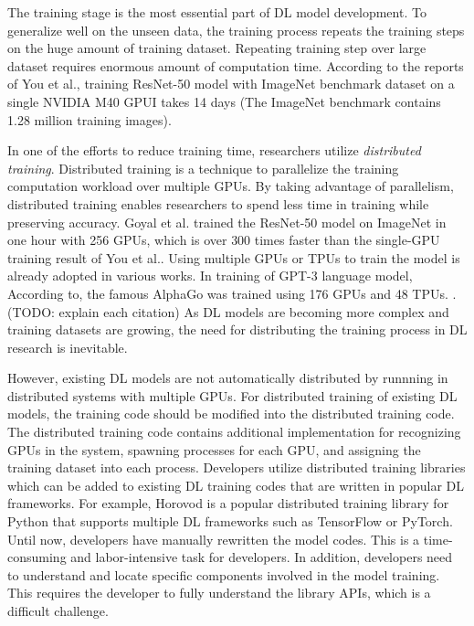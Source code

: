 The training stage is the most essential part of DL model development.
To generalize well on the unseen data,
the training process repeats the training steps on the huge amount of
training dataset.
Repeating training step over large dataset requires enormous
amount of computation time.
According to the reports of You et al.\cite{imagenetraining2017},
training ResNet-50 model with ImageNet benchmark dataset
on a single NVIDIA M40 GPUI takes 14 days
(The ImageNet benchmark\cite{imagenet2014} 
contains 1.28 million training images). 

In one of the efforts to reduce training time, 
researchers utilize \textit{distributed training}.
Distributed training is a technique to parallelize the training computation
workload over multiple GPUs.
By taking advantage of parallelism, distributed training enables researchers
to spend less time in training while preserving accuracy.
Goyal et al.\cite{facebook2018} trained the ResNet-50 model on ImageNet
in one hour with 256 GPUs, which is over 300 times faster than the
single-GPU training result of You et al.\cite{imagenettraining2017}.
Using multiple GPUs or TPUs to train the model is already adopted
in various works.
In training of GPT-3 language model\cite{gpt32020}, 
According to\cite{Silver2017alphagozero}, the famous AlphaGo 
was trained using 176 GPUs and 48 TPUs.
\cite{zhang2019distrspeech} \cite{tian2020distrwebattack}.
(TODO: explain each citation)
As DL models are becoming more complex and training datasets are growing,
the need for distributing the training process in DL research is inevitable.

However, existing DL models are not automatically distributed
by runnning in distributed systems with multiple GPUs.
For distributed training of existing DL models,
the training code should be modified into the distributed training code.
The distributed training code contains additional implementation
for recognizing GPUs in the system, spawning processes for each GPU,
and assigning the training dataset into each process.
Developers utilize distributed training libraries which can be
added to existing DL training codes that are written in popular
DL frameworks. For example, Horovod\cite{sergeev2018horovod} is a
popular distributed training library for Python that supports multiple
DL frameworks such as TensorFlow\cite{tensorflow} or PyTorch\cite{pytorch2019}.
Until now, developers have manually rewritten the model codes.
This is a time-consuming and labor-intensive task for developers.
In addition, developers need to understand and locate 
specific components involved in the model training.
This requires the developer to fully understand the library APIs,
which is a difficult challenge.

